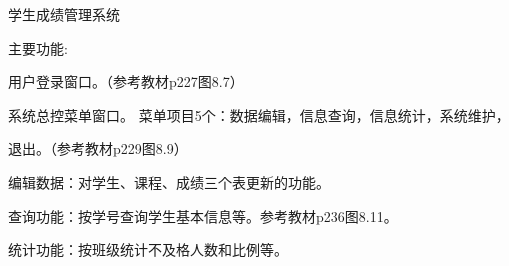 学生成绩管理系统

            \qquad 主要功能:

            \begin{inparaenum}
                \qquad \item 用户登录窗口。（参考教材p227图8.7）

                \qquad \item 系统总控菜单窗口。 菜单项目5个：数据编辑，信息查询，信息统计，系统维护，

                \qquad 退出。（参考教材p229图8.9）

                \qquad \item 编辑数据：对学生、课程、成绩三个表更新的功能。

                \qquad \item 查询功能：按学号查询学生基本信息等。参考教材p236图8.11。

                \qquad \item 统计功能：按班级统计不及格人数和比例等。
            \end{inparaenum}